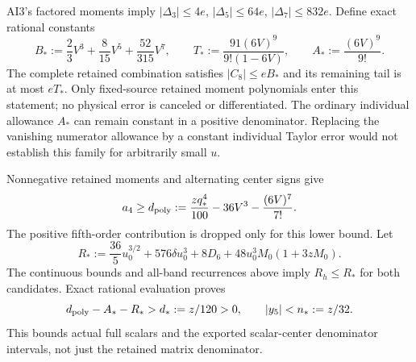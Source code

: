 AI3's factored moments imply $|\Delta_3|\le4e$, $|\Delta_5|\le64e$, $|\Delta_7|\le832e$. Define exact rational constants
\begin{equation}
 B_*:=\frac23V^3+\frac8{15}V^5+\frac{52}{315}V^7,
 \qquad T_*:=\frac{91(6V)^9}{9!(1-6V)},
 \qquad A_*:=\frac{(6V)^9}{9!}.
 \label{r28:eq:ai4-retained-constants}
\end{equation}
The complete retained combination satisfies $|C_8|\le eB_*$ and its remaining tail is at most $eT_*$. Only fixed-source retained moment polynomials enter this statement; no physical error is canceled or differentiated. The ordinary individual allowance $A_*$ can remain constant in a positive denominator. Replacing the vanishing numerator allowance by a constant individual Taylor error would not establish this family for arbitrarily small $u$.

Nonnegative retained moments and alternating center signs give
\begin{equation}
 a_4\ge d_{\rm poly}:=\frac{zq_*^4}{100}-36V^3-\frac{(6V)^7}{7!}.
\end{equation}
The positive fifth-order contribution is dropped only for this lower bound. Let
\begin{equation}
 R_*:=\frac{36}{5}u_0^{3/2}+576\delta u_0^3+8D_6
       +48u_0^3M_0(1+3zM_0).
\end{equation}
The continuous bounds and all-band recurrences above imply $R_h\le R_*$ for both candidates. Exact rational evaluation proves
\begin{equation}
 d_{\rm poly}-A_*-R_*>d_*:=z/120>0,\qquad
 |y_5|<n_*:=z/32.
 \label{r28:eq:ai4-full-denominator}
\end{equation}
This bounds actual full scalars and the exported scalar-center denominator intervals, not just the retained matrix denominator.


